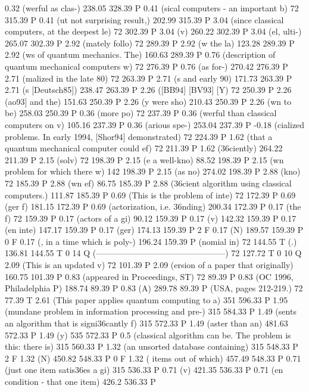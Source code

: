 0.32 (werful as clas-) 238.05 328.39 P
0.41 (sical computers - an important b) 72 315.39 P
0.41 (ut not surprising result,) 202.99 315.39 P
3.04 (since classical computers, at the deepest le) 72 302.39 P
3.04 (v) 260.22 302.39 P
3.04 (el, ulti-) 265.07 302.39 P
2.92 (mately follo) 72 289.39 P
2.92 (w the la) 123.28 289.39 P
2.92 (ws of quantum mechanics. The) 160.63 289.39 P
0.76 (description of quantum mechanical computers w) 72 276.39 P
0.76 (as for-) 270.42 276.39 P
2.71 (malized in the late 80) 72 263.39 P
2.71 (s and early 90) 171.73 263.39 P
2.71 (s [Deutsch85]) 238.47 263.39 P
2.26 ([BB94] [BV93] [Y) 72 250.39 P
2.26 (ao93] and the) 151.63 250.39 P
2.26 (y were sho) 210.43 250.39 P
2.26 (wn to be) 258.03 250.39 P
0.36 (more po) 72 237.39 P
0.36 (werful than classical computers on v) 105.16 237.39 P
0.36 (arious spe-) 253.04 237.39 P
-0.18 (cialized problems. In early 1994, [Shor94] demonstrated) 72 224.39 P
1.62 (that a quantum mechanical computer could ef) 72 211.39 P
1.62 (\336ciently) 264.22 211.39 P
2.15 (solv) 72 198.39 P
2.15 (e a well-kno) 88.52 198.39 P
2.15 (wn problem for which there w) 142 198.39 P
2.15 (as no) 274.02 198.39 P
2.88 (kno) 72 185.39 P
2.88 (wn ef) 86.75 185.39 P
2.88 (\336cient algorithm using classical computers.) 111.87 185.39 P
0.69 (This is the problem of inte) 72 172.39 P
0.69 (ger f) 181.15 172.39 P
0.69 (actorization, i.e. \336nding) 200.34 172.39 P
0.17 (the f) 72 159.39 P
0.17 (actors of a gi) 90.12 159.39 P
0.17 (v) 142.32 159.39 P
0.17 (en inte) 147.17 159.39 P
0.17 (ger) 174.13 159.39 P
2 F
0.17 (N) 189.57 159.39 P
0 F
0.17 (, in a time which is poly-) 196.24 159.39 P
(nomial in) 72 144.55 T
(.) 136.81 144.55 T
0 14 Q
(-----------------------------------------------) 72 127.72 T
0 10 Q
2.09 (This is an updated v) 72 101.39 P
2.09 (ersion of a paper that originally) 160.75 101.39 P
0.83 (appeared in Proceedings, ST) 72 89.39 P
0.83 (OC 1996, Philadelphia P) 188.74 89.39 P
0.83 (A) 289.78 89.39 P
(USA, pages 212-219.) 72 77.39 T
2.61 (This paper applies quantum computing to a) 351 596.33 P
1.95 (mundane problem in information processing and pre-) 315 584.33 P
1.49 (sents an algorithm that is signi\336cantly f) 315 572.33 P
1.49 (aster than an) 481.63 572.33 P
1.49 (y) 535 572.33 P
0.5 (classical algorithm can be. The problem is this: there is) 315 560.33 P
1.32 (an unsorted database containing) 315 548.33 P
2 F
1.32 (N) 450.82 548.33 P
0 F
1.32 ( items out of which) 457.49 548.33 P
0.71 (just one item satis\336es a gi) 315 536.33 P
0.71 (v) 421.35 536.33 P
0.71 (en condition - that one item) 426.2 536.33 P
